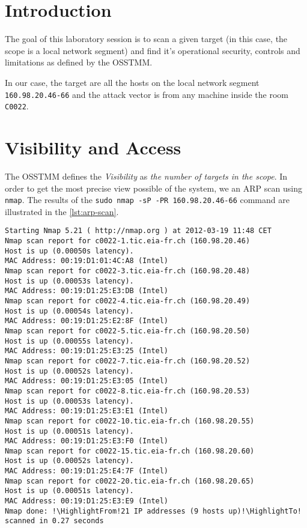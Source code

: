 \documentclass[10pt,a4paper,twoside,onecolumn]{article}
\begin{document}


\cleardoublepage
\setcounter{page}{1}

\section{Introduction}

The goal of this laboratory session is to scan a given target (in this case, the scope is a local network segment) and find it's operational security, controls and limitations as defined by the OSSTMM.

In our case, the target are all the hosts on the local network segment \texttt{160.98.20.46-66} and the attack vector is from any machine inside the room \texttt{C0022}.

\section{Visibility and Access}

The OSSTMM defines the \textit{Visibility} as \textit{the number of targets in the scope}. In order to get the most precise view possible of the system, we an ARP scan using \texttt{nmap}. The results of the \texttt{sudo nmap -sP -PR 160.98.20.46-66} command are illustrated in the \autoref{lst:arp-scan}.

\begin{lstlisting}
Starting Nmap 5.21 ( http://nmap.org ) at 2012-03-19 11:48 CET
Nmap scan report for c0022-1.tic.eia-fr.ch (160.98.20.46)
Host is up (0.00050s latency).
MAC Address: 00:19:D1:01:4C:A8 (Intel)
Nmap scan report for c0022-3.tic.eia-fr.ch (160.98.20.48)
Host is up (0.00053s latency).
MAC Address: 00:19:D1:25:E3:DB (Intel)
Nmap scan report for c0022-4.tic.eia-fr.ch (160.98.20.49)
Host is up (0.00054s latency).
MAC Address: 00:19:D1:25:E2:8F (Intel)
Nmap scan report for c0022-5.tic.eia-fr.ch (160.98.20.50)
Host is up (0.00055s latency).
MAC Address: 00:19:D1:25:E3:25 (Intel)
Nmap scan report for c0022-7.tic.eia-fr.ch (160.98.20.52)
Host is up (0.00052s latency).
MAC Address: 00:19:D1:25:E3:05 (Intel)
Nmap scan report for c0022-8.tic.eia-fr.ch (160.98.20.53)
Host is up (0.00053s latency).
MAC Address: 00:19:D1:25:E3:E1 (Intel)
Nmap scan report for c0022-10.tic.eia-fr.ch (160.98.20.55)
Host is up (0.00051s latency).
MAC Address: 00:19:D1:25:E3:F0 (Intel)
Nmap scan report for c0022-15.tic.eia-fr.ch (160.98.20.60)
Host is up (0.00052s latency).
MAC Address: 00:19:D1:25:E4:7F (Intel)
Nmap scan report for c0022-20.tic.eia-fr.ch (160.98.20.65)
Host is up (0.00051s latency).
MAC Address: 00:19:D1:25:E3:E9 (Intel)
Nmap done: !\HighlightFrom!21 IP addresses (9 hosts up)!\HighlightTo! scanned in 0.27 seconds
\end{lstlisting}
\end{document}
